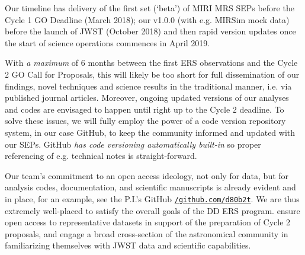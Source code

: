 \smallskip \smallskip
\noindent
Our timeline has delivery of the first set (`beta') of MIRI MRS SEPs
before the Cycle 1 GO Deadline (March 2018); our v1.0.0 (with
e.g. MIRSim mock data) before the launch of JWST (October 2018) and
then rapid version updates once the start of science operations
commences in April 2019.

\smallskip \smallskip
\noindent
With {\it a maximum} of 6 months between the first ERS observations
and the Cycle 2 GO Call for Proposals, 
this will likely be too short for full dissemination of our findings, novel
techniques and science results in the traditional manner, i.e. via
published journal articles. Moreover, ongoing updated versions of our
analyses and codes are envisaged to happen until right up to the Cycle 2
deadline.  To solve these issues, we will fully employ the power of a
code version repository system, in our case GitHub, to keep the
community informed and updated with our SEPs. GitHub {\it has code
versioning automatically built-in} so proper referencing of
e.g. technical notes is straight-forward.

\smallskip \smallskip
\noindent
Our team's commitment to an open access ideology, not only for data,
but for analysis codes, documentation, and scientific manuscripts is
already evident and in place, for an example, see the P.I.'s GitHub
\href{https://github.com/d80b2t}{{\tt /github.com/d80b2t}}.  We are
thus extremely well-placed to satisfy the overall goals of the DD ERS
program.  ensure open access to representative datasets in support of
the preparation of Cycle 2 proposals, and engage a broad cross-section
of the astronomical community in familiarizing themselves with JWST
data and scientific capabilities.

\medskip \medskip
\medskip \medskip

